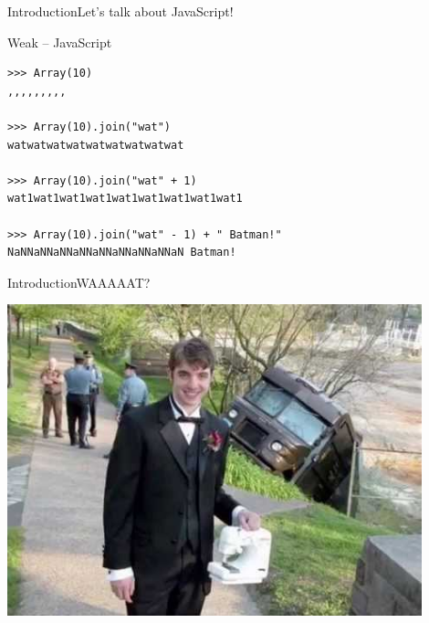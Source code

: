 \documentclass[10pt]{beamer}
\begin{document}
\begin{frame}[fragile]{Introduction}{Let's talk about JavaScript!}
\begin{center}
		
\begin{block}{Weak -- JavaScript}
			
\begin{lstlisting}
>>> Array(10)
,,,,,,,,,

>>> Array(10).join("wat")
watwatwatwatwatwatwatwatwat

>>> Array(10).join("wat" + 1)
wat1wat1wat1wat1wat1wat1wat1wat1wat1

>>> Array(10).join("wat" - 1) + " Batman!"      
NaNNaNNaNNaNNaNNaNNaNNaNNaN Batman!
\end{lstlisting}
			
			
\end{block}
		
\end{center}
	
\end{frame}

\begin{frame}{Introduction}{WAAAAAT?}
	\begin{center}
		\includegraphics[width=0.9\textwidth]{pictures/wat.jpg}
	\end{center}
\end{frame}
\end{document}
